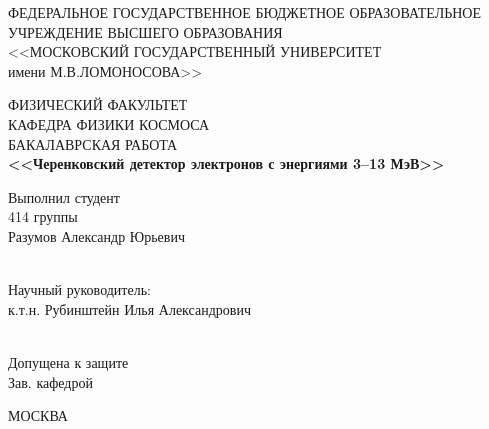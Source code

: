 \documentclass[12pt,a4paper]{report} %
\renewcommand{\small}{\fontsize{12}{14.5pt}\selectfont}
\renewcommand{\normalsize}{\fontsize{14}{18pt}\selectfont}
\renewcommand{\large}{\fontsize{17}{20pt}\selectfont}
\renewcommand{\Large}{\fontsize{20}{25pt}\selectfont}
\begin{document}
\setlength{\parindent}{1.25cm} %
\sloppy   %

\onehalfspacing   %
\renewcommand{\cftchapdotsep}{\cftdotsep} %

\renewcommand\bibname{СПИСОК ИСПОЛЬЗОВАННЫХ ИСТОЧНИКОВ}

\thispagestyle{empty}
\begin{center}
ФЕДЕРАЛЬНОЕ ГОСУДАРСТВЕННОЕ БЮДЖЕТНОЕ ОБРАЗОВАТЕЛЬНОЕ
УЧРЕЖДЕНИЕ ВЫСШЕГО ОБРАЗОВАНИЯ \\
<<МОСКОВСКИЙ ГОСУДАРСТВЕННЫЙ УНИВЕРСИТЕТ\\
имени М.В.ЛОМОНОСОВА>>

\vspace{.5cm}
ФИЗИЧЕСКИЙ ФАКУЛЬТЕТ\\
\vspace{.5cm}
КАФЕДРА ФИЗИКИ КОСМОСА\\
\vfill
БАКАЛАВРСКАЯ РАБОТА\\
\vspace{.5cm}
\Large
\textbf{<<Черенковский детектор электронов с энергиями 3--13 МэВ>>}
\large

\end{center}

\vfill

\begin{flushright}
Выполнил студент \\
414 группы\\
Разумов Александр Юрьевич\\

\underline{\hspace{3cm}}\\ %

\vspace{1cm}

Научный руководитель:\\
к.т.н. Рубинштейн Илья Александрович\\
\underline{\hspace{3cm}}\\

\end{flushright}

\vfill
\begin{flushleft}
Допущена к защите \\
Зав. кафедрой \underline{\hspace{3cm}} \\
\end{flushleft}
\begin{center}
\vfill

\small МОСКВА \\ \number\year\normalsize
\end{center}
\end{document}
